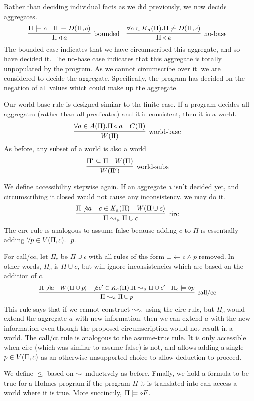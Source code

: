 Rather than deciding individual facts as we did previously, we now decide aggregates.
\[
	\infer[\textrm{bounded}]{\Pi \decides a}{\Pi \models c & \Pi \models \decirc{\Pi}{c}}
	\quad
	\infer[\textrm{no-base}]{\Pi \decides a}{\forall c \in \circset_a(\Pi). \Pi \not \models \decirc{\Pi}{c}}
\]
The bounded case indicates that we have circumscribed this aggregate, and so have decided it.
The no-base case indicates that this aggregate is totally unpopulated by the program.
As we cannot circumscribe over it, we are considered to decide the aggregate.
Specifically, the program has decided on the negation of all values which could make up the aggregate.

Our world-base rule is designed similar to the finite case.
If a program decides all aggregates (rather than all predicates) and it is consistent, then it is a world.
\[
	\infer[\textrm{world-base}]{\world{\Pi}}{\forall a \in \aggset(\Pi). \Pi \decides a & C(\Pi)}
\]
As before, any subset of a world is also a world
\[
	\infer[\textrm{world-subs}]{\world{\Pi'}}{\Pi' \subseteq \Pi & \world{\Pi}}
\]

We define accessibility stepwise again.
If an aggregate $a$ isn't decided yet, and circumscribing it closed would not cause any inconsistency, we may do it.
\[
	\infer[\textrm{circ}]{\Pi \stepass_a \Pi \cup c}{\Pi \not \decides a & c \in \circset_a(\Pi) & W(\Pi \cup c)}
\]
The circ rule is analogous to assume-false because adding $c$ to $\Pi$ is essentially adding $\forall p \in V(\Pi, c). \neg p$.

For call/cc, let $\Pi_c$ be $\Pi \cup c$ with all rules of the form $\bot \leftarrow c \wedge p$ removed.
In other words, $\Pi_c$ is $\Pi \cup c$, but will ignore inconsistencies which are based on the addition of $c$.
\[\small
	\infer[\textrm{call/cc}]{\Pi \stepass_a \Pi \cup p}{\Pi \not \decides a & \world{\Pi \cup p} & \not \exists c' \in \circset_a(\Pi). \Pi \stepass_a \Pi \cup c' & \Pi_c \models \dia p}
\]
This rule says that if we cannot construct $\leadsto_a$ using the circ rule, but $\Pi_c$ would extend the aggregate $a$ with new information, then we can extend $a$ with the new information even though the proposed circumscription would not result in a world.
The call/cc rule is analogous to the assume-true rule.
It is only accessible when circ (which was similar to assume-false) is not, and allows adding a single $p \in V(\Pi, c)$ as an otherwise-unsupported choice to allow deduction to proceed.

We define $\leq$ based on $\leadsto$ inductively as before.
Finally, we hold a formula to be true for a Holmes program if the program $\Pi$ it is translated into can access a world where it is true. More succinctly, $\Pi \models \diamond F$.

